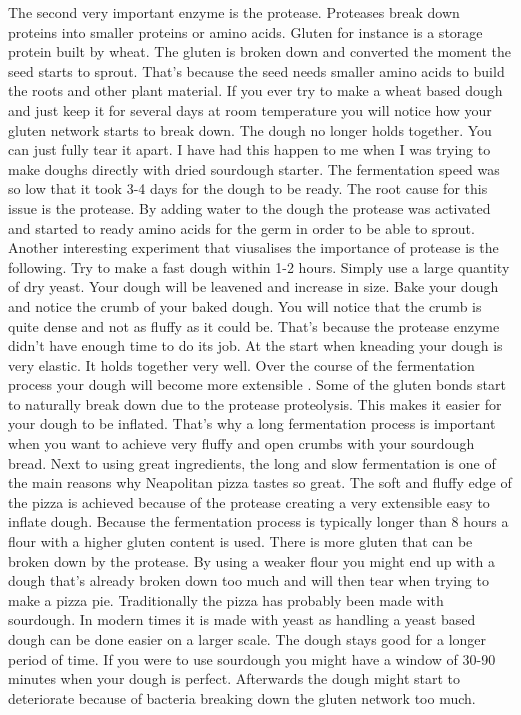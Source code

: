 The second very important enzyme is the protease. Proteases
break down proteins into smaller proteins or amino acids.
Gluten for instance is a storage protein built by wheat.
The gluten is broken down and converted the moment the
seed starts to sprout. That's because the seed needs
smaller amino acids to build the roots and other plant material.
If you ever try to make a wheat based dough and just keep
it for several days at room temperature you will notice
how your gluten network starts to break down. The dough
no longer holds together. You can just fully tear it apart.
I have had this happen to me when I was trying to make
doughs directly with dried sourdough starter. The fermentation
speed was so low that it took 3-4 days for the dough
to be ready. The root cause for this issue is the protease.
By adding water to the dough the protease was activated
and started to ready amino acids for the germ in order to be
able to sprout. Another interesting experiment that viusalises
the importance of protease is the following. Try to make a
fast dough within 1-2 hours. Simply use a large quantity
of dry yeast. Your dough will be leavened and increase in size.
Bake your dough and notice the crumb of your baked dough.
You will notice that the crumb is quite dense and not as
fluffy as it could be. That's because the protease enzyme
didn't have enough time to do its job. At the start
when kneading your dough is very elastic. It holds together
very well. Over the course of the fermentation process
your dough will become more extensible \cite{protease+enzyme+bread}.
Some of the gluten bonds start to naturally break
down due to the protease proteolysis. This makes it easier
for your dough to be inflated. That's why a long
fermentation process is important when you want to
achieve very fluffy and open crumbs with your sourdough
bread. Next to using great ingredients, the long and
slow fermentation is one of the main reasons why
Neapolitan pizza tastes so great. The soft and fluffy
edge of the pizza is achieved because of the protease
creating a very extensible easy to inflate dough. Because
the fermentation process is typically longer than 8
hours a flour with a higher gluten content is used. There
is more gluten that can be broken down by the protease.
By using a weaker flour you might end up with a dough
that's already broken down too much and will then tear
when trying to make a pizza pie. Traditionally the pizza
has probably been made with sourdough. In modern times
it is made with yeast as handling a yeast based
dough can be done easier on a larger scale. The dough
stays good for a longer period of time. If you were to use
sourdough you might have a window of 30-90 minutes when
your dough is perfect. Afterwards the dough might
start to deteriorate because of bacteria breaking
down the gluten network too much.

